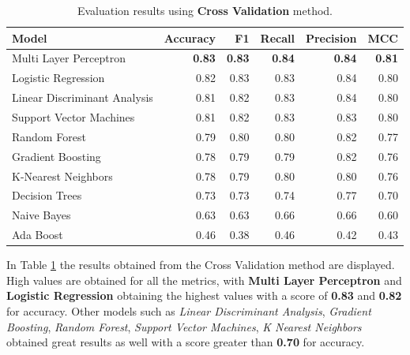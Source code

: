             \begin{table}[htbp]
                \centering
                \begin{tabular}{lrrrrr}
                    \toprule
                    \textbf{Model} & \textbf{Accuracy} & \textbf{F1} & \textbf{Recall} & \textbf{Precision} & \textbf{MCC} \\
                    \midrule
                    Multi Layer Perceptron & \textbf{0.83} & \textbf{0.83} & \textbf{0.84} & \textbf{0.84} & \textbf{0.81} \\
                    Logistic Regression & 0.82 & 0.83 & 0.83 & 0.84 & 0.80 \\
                    Linear Discriminant Analysis & 0.81 & 0.82 & 0.83 & 0.84 & 0.80 \\
                    Support Vector Machines & 0.81 & 0.82 & 0.83 & 0.83 & 0.80 \\
                    Random Forest & 0.79 & 0.80 & 0.80 & 0.82 & 0.77 \\
                    Gradient Boosting & 0.78 & 0.79 & 0.79 & 0.82 & 0.76 \\
                    K-Nearest Neighbors & 0.78 & 0.79 & 0.80 & 0.80 & 0.76 \\
                    Decision Trees & 0.73 & 0.73 & 0.74 & 0.77 & 0.70 \\
                    Naive Bayes & 0.63 & 0.63 & 0.66 & 0.66 & 0.60 \\
                    Ada Boost & 0.46 & 0.38 & 0.46 & 0.42 & 0.43 \\
                    \bottomrule
                \end{tabular}
                \caption{Evaluation results using \textbf{Cross Validation} method.}
                \label{tab:feature_engineering_approach_cv}
            \end{table}

            In Table \ref{tab:feature_engineering_approach_cv} the results obtained from the Cross Validation method are displayed. High values are obtained for all the metrics, with \textbf{Multi Layer Perceptron}  and \textbf{Logistic Regression} obtaining the highest values with a score of \textbf{0.83} and \textbf{0.82} for accuracy. Other models such as \textit{Linear Discriminant Analysis}, \textit{Gradient Boosting}, \textit{Random Forest}, \textit{Support Vector Machines}, \textit{K Nearest Neighbors} obtained great results as well with a score greater than \textbf{0.70} for accuracy. 

